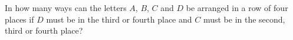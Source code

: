 In how many ways can the letters $A$, $B$, $C$ and $D$ be arranged in a row of four places if $D$ must be in the third or fourth place and $C$ must be in the second, third or fourth place?

